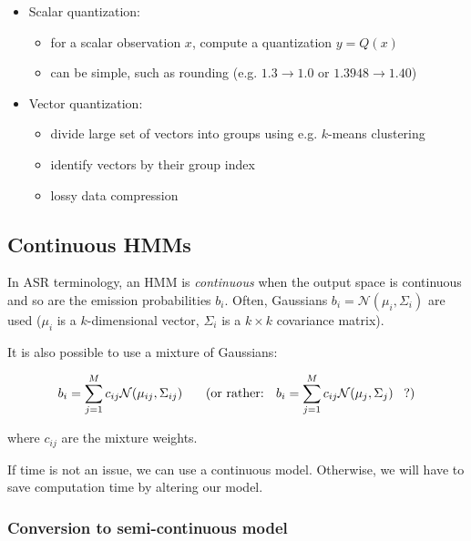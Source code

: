 \documentclass[11pt]{article}
\begin{document}
\begin{itemize}
    \item Scalar quantization:
        \begin{itemize}
            \item for a scalar observation $x$, compute a quantization $y = Q(x)$
            \item can be simple, such as rounding (e.g. $1.3 \rightarrow 1.0$ or $1.3948 \rightarrow 1.40$)
        \end{itemize}
    \item Vector quantization:
        \begin{itemize}
            \item divide large set of vectors into groups using e.g. $k$-means clustering
            \item identify vectors by their group index
            \item lossy data compression
        \end{itemize}
\end{itemize}

\subsection{Continuous HMMs}

In ASR terminology, an HMM is \textit{continuous} when the output space is continuous and so are the emission probabilities $b_i$. Often, Gaussians $b_i = \mathcal{N}(\mu_i, \Sigma_i)$ are used ($\mu_i$ is a $k$-dimensional vector, $\Sigma_i$ is a $k \times k$ covariance matrix).

It is also possible to use a mixture of Gaussians:

\[
    b_i = \sum\limits_{j=1}^M c_{ij} \mathcal{N}(\mu_{ij}, \Sigma_{ij}) \mbox{\hspace{15pt} (or rather: \hspace{5pt}} b_i = \sum\limits_{j=1}^M c_{ij} \mathcal{N}(\mu_{j}, \Sigma_{j}) \mbox{\hspace{5pt} ?)}
\]

where $c_{ij}$ are the mixture weights.

If time is not an issue, we can use a continuous model. Otherwise, we will have to save computation time by altering our model.

\subsubsection{Conversion to semi-continuous model}
\end{document}
